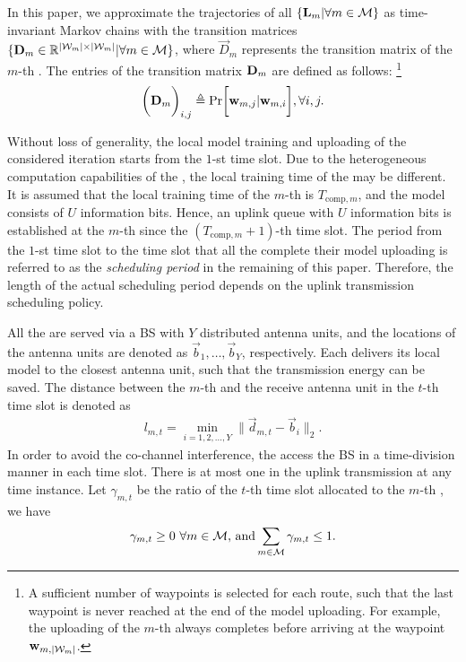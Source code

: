 In this paper, we approximate the trajectories of all {\IAVs} $\{ \mathbf{L}_{m} | \forall m\in\mathcal{M} \}$ as time-invariant Markov chains with the transition matrices
$\{ \mathbf{D}_{m} \in \mathbb{R}^{|\mathcal{W}_{m}| \times |\mathcal{W}_{m}|} | \forall m\in\mathcal{M} \}$, where $\vec{D}_{m}$ represents the transition matrix of the $m$-th {\IAV}.
The entries of the transition matrix $\mathbf{D}_{m}$ are defined as follows:
\footnote{
    A sufficient number of waypoints is selected for each route, such that the last waypoint is never reached at the end of the model uploading.
    For example, the uploading of the $m$-th {\IAV} always completes before arriving at the waypoint $\mathbf{w}_{m,|\mathcal{W}_m|}$.
}
\begin{align}
     \Paren{\TransD_{m}}_{i,j} \define \Pr\Bracket{ \vec{w}_{m,j} | \vec{w}_{m,i} }, \forall i,j.
    \label{eqn:trans_mat}
\end{align}

Without loss of generality, the local model training and uploading of the considered iteration starts from the $1$-st time slot.
Due to the heterogeneous computation capabilities of the {\IAVs}, the local training time of the {\IAVs} may be different.
It is assumed that the local training time of the $m$-th {\IAV} is $T_{\text{comp},m}$, and the model consists of $U$ information bits.
Hence, an uplink queue with $U$ information bits is established at the $m$-th {\IAV} since the $(T_{\text{comp},m}+1)$-th time slot.
The period from the $1$-st time slot to the time slot that all the {\IAVs} complete their model uploading is referred to as the \emph{scheduling period} in the remaining of this paper.
Therefore, the length of the actual scheduling period depends on the uplink transmission scheduling policy.

All the {\IAVs} are served via a BS with $Y$ distributed antenna units,
and the locations of the antenna units are denoted as $\vec{b}_1, \dots, \vec{b}_Y$, respectively.
Each {\IAV} delivers its local model to the closest antenna unit, such that the transmission energy can be saved.
The distance between the $m$-th {\IAV} and the receive antenna unit in the $t$-th time slot is denoted as
\begin{align*}
    l_{m,t} = \min_{i=1,2,\dots,Y} \|\vec{d}_{m,t} - \vec{b}_i\|_2.
\end{align*}
In order to avoid the co-channel interference, the {\IAVs} access the BS in a time-division manner in each time slot. There is at most one {\IAV} in the uplink transmission at any time instance. Let $\gamma_{m,t}$ be the ratio of the $t$-th time slot allocated to the $m$-th {\IAV}, we have
\begin{align*}
    \gamma_{m,t} \geq 0~\forall m\in\mathcal{M} \text{,~and} \sum_{m\in\mathcal{M}} \gamma_{m,t} \leq 1.
\end{align*}

